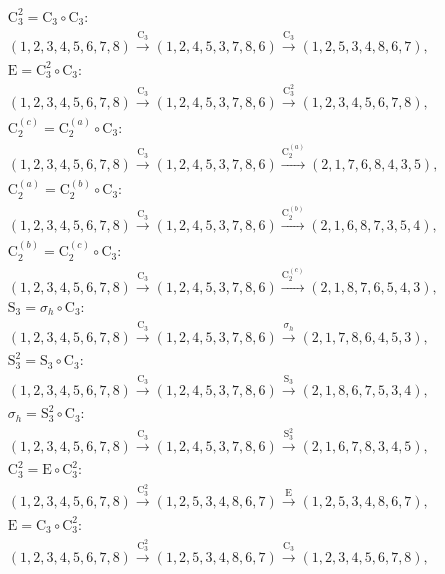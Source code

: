 \begin{align*}
& \mathrm{C}_{3}^{2} = \mathrm{C}_{3} \circ \mathrm{C}_{3}:\; \\& (1,2,3,4,5,6,7,8) \xrightarrow{\mathrm{C}_{3}} (1,2,4,5,3,7,8,6) \xrightarrow{\mathrm{C}_{3}} (1,2,5,3,4,8,6,7), \\
& \mathrm{E} = \mathrm{C}_{3}^{2} \circ \mathrm{C}_{3}:\; \\& (1,2,3,4,5,6,7,8) \xrightarrow{\mathrm{C}_{3}} (1,2,4,5,3,7,8,6) \xrightarrow{\mathrm{C}_{3}^{2}} (1,2,3,4,5,6,7,8), \\
& \mathrm{C}_{2}^{(c)} = \mathrm{C}_{2}^{(a)} \circ \mathrm{C}_{3}:\; \\& (1,2,3,4,5,6,7,8) \xrightarrow{\mathrm{C}_{3}} (1,2,4,5,3,7,8,6) \xrightarrow{\mathrm{C}_{2}^{(a)}} (2,1,7,6,8,4,3,5), \\
& \mathrm{C}_{2}^{(a)} = \mathrm{C}_{2}^{(b)} \circ \mathrm{C}_{3}:\; \\& (1,2,3,4,5,6,7,8) \xrightarrow{\mathrm{C}_{3}} (1,2,4,5,3,7,8,6) \xrightarrow{\mathrm{C}_{2}^{(b)}} (2,1,6,8,7,3,5,4), \\
& \mathrm{C}_{2}^{(b)} = \mathrm{C}_{2}^{(c)} \circ \mathrm{C}_{3}:\; \\& (1,2,3,4,5,6,7,8) \xrightarrow{\mathrm{C}_{3}} (1,2,4,5,3,7,8,6) \xrightarrow{\mathrm{C}_{2}^{(c)}} (2,1,8,7,6,5,4,3), \\
& \mathrm{S}_{3} = \sigma_{h} \circ \mathrm{C}_{3}:\; \\& (1,2,3,4,5,6,7,8) \xrightarrow{\mathrm{C}_{3}} (1,2,4,5,3,7,8,6) \xrightarrow{\sigma_{h}} (2,1,7,8,6,4,5,3), \\
& \mathrm{S}_{3}^{2} = \mathrm{S}_{3} \circ \mathrm{C}_{3}:\; \\& (1,2,3,4,5,6,7,8) \xrightarrow{\mathrm{C}_{3}} (1,2,4,5,3,7,8,6) \xrightarrow{\mathrm{S}_{3}} (2,1,8,6,7,5,3,4), \\
& \sigma_{h} = \mathrm{S}_{3}^{2} \circ \mathrm{C}_{3}:\; \\& (1,2,3,4,5,6,7,8) \xrightarrow{\mathrm{C}_{3}} (1,2,4,5,3,7,8,6) \xrightarrow{\mathrm{S}_{3}^{2}} (2,1,6,7,8,3,4,5), \\
& \mathrm{C}_{3}^{2} = \mathrm{E} \circ \mathrm{C}_{3}^{2}:\; \\& (1,2,3,4,5,6,7,8) \xrightarrow{\mathrm{C}_{3}^{2}} (1,2,5,3,4,8,6,7) \xrightarrow{\mathrm{E}} (1,2,5,3,4,8,6,7), \\
& \mathrm{E} = \mathrm{C}_{3} \circ \mathrm{C}_{3}^{2}:\; \\& (1,2,3,4,5,6,7,8) \xrightarrow{\mathrm{C}_{3}^{2}} (1,2,5,3,4,8,6,7) \xrightarrow{\mathrm{C}_{3}} (1,2,3,4,5,6,7,8), \\

\end{align*}
